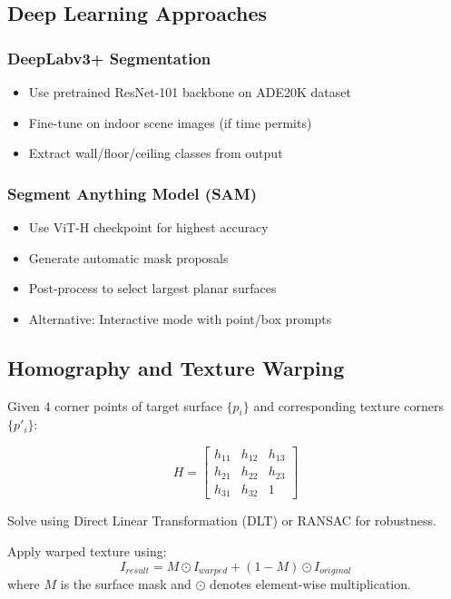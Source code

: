 \documentclass[11pt]{article}
\begin{document}
\subsection{Deep Learning Approaches}

\subsubsection{DeepLabv3+ Segmentation}
\begin{itemize}
    \item Use pretrained ResNet-101 backbone on ADE20K dataset
    \item Fine-tune on indoor scene images (if time permits)
    \item Extract wall/floor/ceiling classes from output
\end{itemize}

\subsubsection{Segment Anything Model (SAM)}
\begin{itemize}
    \item Use ViT-H checkpoint for highest accuracy
    \item Generate automatic mask proposals
    \item Post-process to select largest planar surfaces
    \item Alternative: Interactive mode with point/box prompts
\end{itemize}

\subsection{Homography and Texture Warping}

Given 4 corner points of target surface $\{p_i\}$ and corresponding texture corners $\{p'_i\}$:

\begin{equation}
    H = \begin{bmatrix} h_{11} & h_{12} & h_{13} \\ h_{21} & h_{22} & h_{23} \\ h_{31} & h_{32} & 1 \end{bmatrix}
\end{equation}

Solve using Direct Linear Transformation (DLT) or RANSAC for robustness.

Apply warped texture using:
\begin{equation}
    I_{result} = M \odot I_{warped} + (1-M) \odot I_{original}
\end{equation}
where $M$ is the surface mask and $\odot$ denotes element-wise multiplication.
\end{document}
